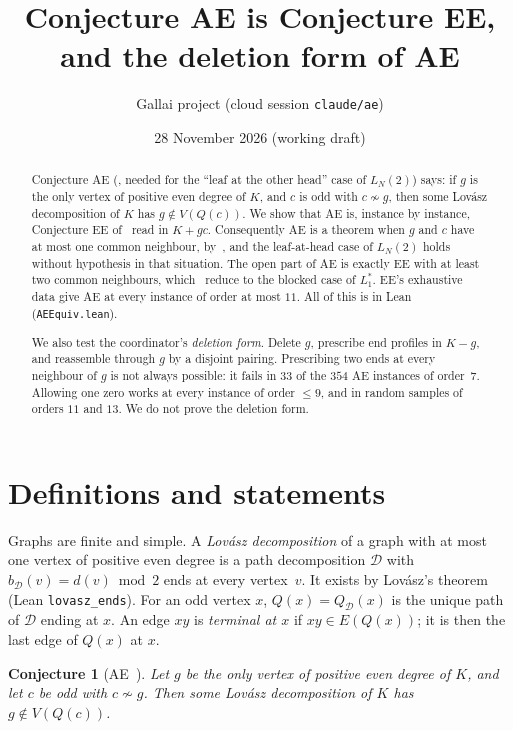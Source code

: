\documentclass[11pt]{amsart}
\title[Conjecture AE]{Conjecture AE is Conjecture EE,\\ and the deletion form of AE}
\author{Gallai project (cloud session \texttt{claude/ae})}
\date{28 November 2026 (working draft)}
\newtheorem{conjecture}[theorem]{Conjecture}
\theoremstyle{definition}
\newcommand{\cD}{\mathcal D}
\newcommand{\lean}[1]{\quad{\footnotesize[Lean: \texttt{#1}]}}
\begin{document}
\begin{abstract}
Conjecture AE (\cite{CR}, needed for the ``leaf at the other head'' case of $L_N(2)$) says: if $g$
is the only vertex of positive even degree of $K$, and $c$ is odd with $c\not\sim g$, then some
Lov\'asz decomposition of $K$ has $g\notin V(Q(c))$. We show that AE is, instance by instance,
Conjecture EE of~\cite{PE} read in $K+gc$. Consequently AE is a theorem when $g$ and $c$ have at most
one common neighbour, by~\cite[Theorem~5.1]{PE}, and the leaf-at-head case of $L_N(2)$ holds
without hypothesis in that situation. The open part of AE is exactly EE with at least two common
neighbours, which~\cite{PE,L1S} reduce to the blocked case of $L_1^*$. EE's exhaustive data give AE
at every instance of order at most $11$. All of this is in Lean (\texttt{AEEquiv.lean}).

We also test the coordinator's \emph{deletion form}. Delete $g$, prescribe end profiles in $K-g$,
and reassemble through $g$ by a disjoint pairing. Prescribing two ends at every neighbour of $g$ is
not always possible: it fails in $33$ of the $354$ AE instances of order~$7$. Allowing one zero
works at every instance of order $\le9$, and in random samples of orders $11$ and $13$. We do not
prove the deletion form.
\end{abstract}
\maketitle

\section{Definitions and statements}

Graphs are finite and simple. A \emph{Lov\'asz decomposition} of a graph with at most one vertex of
positive even degree is a path decomposition $\cD$ with $b_\cD(v)=d(v)\bmod 2$ ends at every
vertex~$v$. It exists by Lov\'asz's theorem (Lean \texttt{lovasz\_ends}). For an odd vertex $x$,
$Q(x)=Q_\cD(x)$ is the unique path of $\cD$ ending at $x$. An edge $xy$ is \emph{terminal at $x$} if
$xy\in E(Q(x))$; it is then the last edge of $Q(x)$ at $x$.

\begin{conjecture}[AE~{\cite[Conjecture AE]{CR}}]\label{conj:AE}
Let $g$ be the only vertex of positive even degree of $K$, and let $c$ be odd with $c\not\sim g$.
Then some Lov\'asz decomposition of $K$ has $g\notin V(Q(c))$.\lean{ConjAE}
\end{conjecture}
\end{document}
